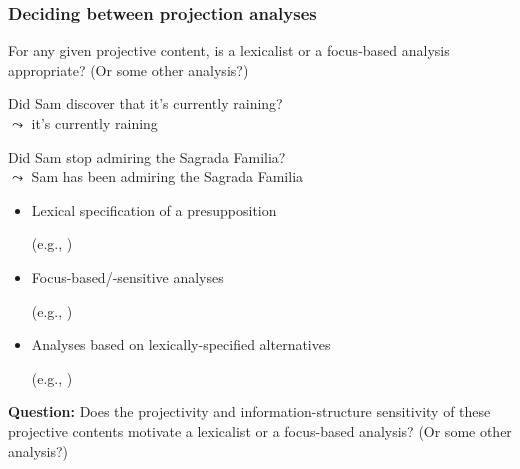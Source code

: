 \documentclass[pdf,xcolor=table,envcountsect,handout]{beamer}
\begin{document}
\begin{frame}
\frametitle{Deciding between projection analyses}

For any given projective content, is a lexicalist or a focus-based analysis appropriate? (Or some other analysis?)

\pause

\begin{exe}
 Did Sam discover that it's currently raining?
\\ $\leadsto$ it's currently raining 

\pause

 Did Sam stop admiring the Sagrada Familia?
\\ $\leadsto$ Sam has been admiring the Sagrada Familia

\end{exe}

\medskip
\pause

\begin{itemize}[topsep=-1ex]

\item Lexical specification of a presupposition \hfill \begin{tiny} (e.g., \citealt{heim83,vds92}) \end{tiny}

\item Focus-based/-sensitive analyses \hfill \begin{tiny} (e.g., \citealt{abrusan2011,abrusan2016,best-question}) \end{tiny}

\item Analyses based on lexically-specified alternatives \\[-.2cm] \hfill \begin{tiny} (e.g., \citealt{abusch10,romoli2015}) \end{tiny}

\end{itemize}

\pause
\bigskip

{\bf Question:} Does the projectivity and information-structure sensitivity of these projective contents motivate a lexicalist or a focus-based analysis? (Or some other analysis?)

\end{frame}
\end{document}
